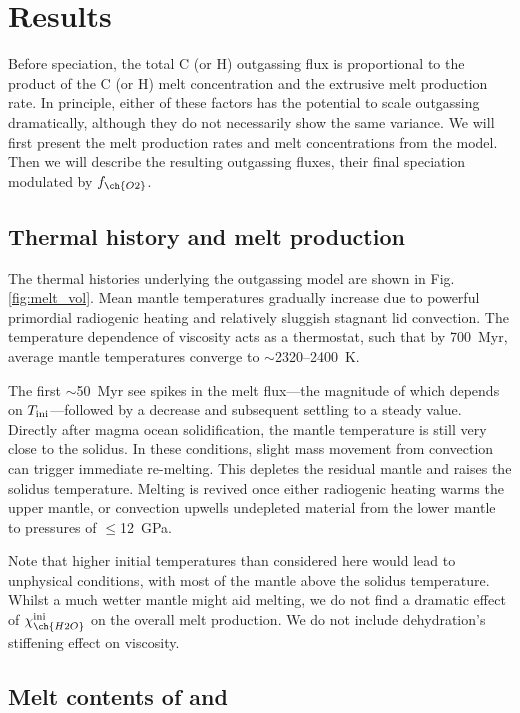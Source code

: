 \section{Results}

Before speciation, the total C (or H) outgassing flux is proportional to the product of the C (or H) melt concentration and the extrusive melt production rate. In principle, either of these factors has the potential to scale outgassing dramatically, although they do not necessarily show the same variance. We will first present the melt production rates and melt concentrations from the model. Then we will describe the resulting outgassing fluxes, their final speciation modulated by $f_{\ch{O2}}$.


\subsection{Thermal history and melt production}




The thermal histories underlying the outgassing model are shown in Fig. \ref{fig:melt_vol}. Mean mantle temperatures gradually increase due to powerful primordial radiogenic heating and relatively sluggish stagnant lid convection. The temperature dependence of viscosity acts as a thermostat, such that by 700~Myr, average mantle temperatures converge to $\sim$2320--2400~K.

The first $\sim$50~Myr see spikes in the melt flux---the magnitude of which depends on $T_{\rm ini}$---followed by a decrease and subsequent settling to a steady value. Directly after magma ocean solidification, the mantle temperature is still very close to the solidus. In these conditions, slight mass movement from convection can trigger immediate re-melting. This depletes the residual mantle and raises the solidus temperature. Melting is revived once either radiogenic heating warms the upper mantle, or convection upwells undepleted material from the lower mantle to pressures of $\le$12~GPa. 


Note that higher initial temperatures than considered here would lead to unphysical conditions, with most of the mantle above the solidus temperature. Whilst a much wetter mantle might aid melting, we do not find a dramatic effect of $\chi_{\ch{H2O}}^{\rm ini}$ on the overall melt production. We do not include dehydration's stiffening effect on viscosity.


\subsection{Melt contents of  and }


